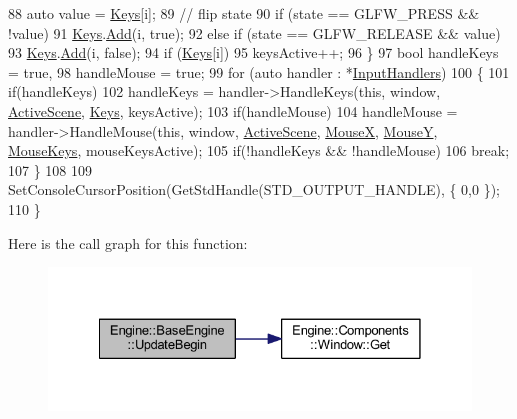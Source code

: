 \begin{DoxyCode}
88         \textcolor{keyword}{auto} value = \mbox{\hyperlink{classEngine_1_1BaseEngine_a65321a97e83f0a6ee90df3efac2d3307}{Keys}}[i];
89         \textcolor{comment}{// flip state}
90         \textcolor{keywordflow}{if} (state == GLFW\_PRESS && !value)
91             \mbox{\hyperlink{classEngine_1_1BaseEngine_a65321a97e83f0a6ee90df3efac2d3307}{Keys}}.\mbox{\hyperlink{classGeneric_1_1Dictionary_ae7cb006f801b21c172e8fbac8794fa99}{Add}}(i, \textcolor{keyword}{true});
92         \textcolor{keywordflow}{else} \textcolor{keywordflow}{if} (state == GLFW\_RELEASE && value)
93             \mbox{\hyperlink{classEngine_1_1BaseEngine_a65321a97e83f0a6ee90df3efac2d3307}{Keys}}.\mbox{\hyperlink{classGeneric_1_1Dictionary_ae7cb006f801b21c172e8fbac8794fa99}{Add}}(i, \textcolor{keyword}{false});
94         \textcolor{keywordflow}{if} (\mbox{\hyperlink{classEngine_1_1BaseEngine_a65321a97e83f0a6ee90df3efac2d3307}{Keys}}[i])
95             keysActive++;
96     \}
97     \textcolor{keywordtype}{bool} handleKeys = \textcolor{keyword}{true},
98          handleMouse = \textcolor{keyword}{true};
99     \textcolor{keywordflow}{for} (\textcolor{keyword}{auto} handler : *\mbox{\hyperlink{classEngine_1_1BaseEngine_a134fa082c5a64d62b76ddf926647e7cc}{InputHandlers}})
100     \{
101         \textcolor{keywordflow}{if}(handleKeys)
102             handleKeys = handler->HandleKeys(\textcolor{keyword}{this}, window, \mbox{\hyperlink{classEngine_1_1BaseEngine_adb3dbc839da9d821e08b18d8a221698d}{ActiveScene}}, 
      \mbox{\hyperlink{classEngine_1_1BaseEngine_a65321a97e83f0a6ee90df3efac2d3307}{Keys}}, keysActive);
103         \textcolor{keywordflow}{if}(handleMouse)
104             handleMouse = handler->HandleMouse(\textcolor{keyword}{this}, window, \mbox{\hyperlink{classEngine_1_1BaseEngine_adb3dbc839da9d821e08b18d8a221698d}{ActiveScene}}, 
      \mbox{\hyperlink{classEngine_1_1BaseEngine_a5fe085152ebe93346900407f6b41a034}{MouseX}}, \mbox{\hyperlink{classEngine_1_1BaseEngine_a143c9c32dbbdc70bf1546ffe275bf384}{MouseY}}, \mbox{\hyperlink{classEngine_1_1BaseEngine_a3ee2bdddb66d45b8c808ffd937ba9c50}{MouseKeys}}, mouseKeysActive);
105         \textcolor{keywordflow}{if}(!handleKeys && !handleMouse)
106             \textcolor{keywordflow}{break};
107     \}
108 
109     SetConsoleCursorPosition(GetStdHandle(STD\_OUTPUT\_HANDLE), \{ 0,0 \});
110 \}
\end{DoxyCode}
Here is the call graph for this function\+:
\nopagebreak
\begin{figure}[H]
\begin{center}
\leavevmode
\includegraphics[width=328pt]{classEngine_1_1BaseEngine_aace6be2a42d12b64fbd35f1acdb08408_cgraph}
\end{center}
\end{figure}
